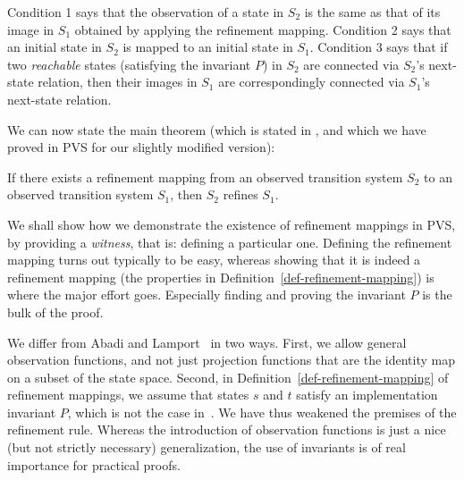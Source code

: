 \noindent
Condition 1 says that the observation of a state in $S_2$ is the same as that of
its image in $S_1$ obtained by applying the refinement mapping.
%
Condition 2 says that an initial state in $S_2$ is mapped to an initial state in $S_1$.
%
Condition 3 says that if two {\em reachable} states (satisfying the invariant $P$) 
in $S_2$ are connected via $S_2$'s next-state relation, then their images in $S_1$ 
are correspondingly connected via $S_1$'s next-state relation.

We   can now    state   the  main   theorem   (which  is   stated   in
\cite{AL:Mappings}, and which we have proved in  PVS for our slightly
modified version):

\begin{theorem}
\label{theorem-refinement}
If there exists a refinement mapping from an observed transition system $S_2$
to an observed transition system $S_1$, then $S_2$ refines $S_1$. 

\end{theorem}

We shall show how we demonstrate the  existence of refinement mappings
in PVS,  by providing a {\em witness},  that is: defining a particular
one. Defining the refinement mapping  turns out typically to be  easy,
whereas showing that it is indeed a refinement mapping (the properties
in Definition~\ref{def-refinement-mapping}) is  where the  major  effort
goes.  Especially finding and proving the invariant $P$ is the bulk of
the proof.

We   differ from Abadi  and Lamport~\cite{AL:Mappings} in two
ways.  First, we allow general  observation functions, and not
just projection functions that are the identity map on a subset of   the
state space.   Second, in Definition~\ref{def-refinement-mapping} of
refinement mappings,  we  assume that states  $s$  and $t$  satisfy an
implementation     invariant  $P$,   which    is   not   the  case
in~\cite{AL:Mappings}\@.   We have thus weakened the premises of
the refinement rule.  Whereas the introduction of observation functions
is just a nice (but not   strictly   necessary) generalization,
the use of invariants is of real importance for practical proofs.








